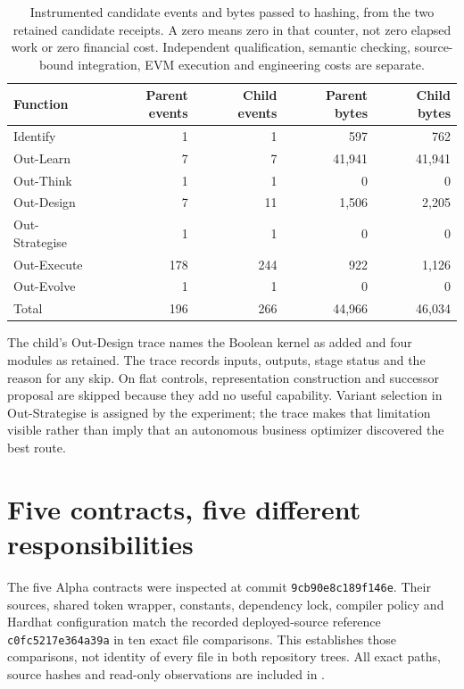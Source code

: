 \documentclass[11pt]{article}
\newcommand{\filename}[1]{\path{#1}}
\begin{document}
\begin{table}[htbp]
\centering
\small
\begin{tabularx}{\linewidth}{Yrrrr}
\toprule
\textbf{Function} & \textbf{Parent events} & \textbf{Child events} & \textbf{Parent bytes} & \textbf{Child bytes}\\
\midrule
Identify & 1 & 1 & 597 & 762\\
Out-Learn & 7 & 7 & 41,941 & 41,941\\
Out-Think & 1 & 1 & 0 & 0\\
Out-Design & 7 & 11 & 1,506 & 2,205\\
Out-Strategise & 1 & 1 & 0 & 0\\
Out-Execute & 178 & 244 & 922 & 1,126\\
Out-Evolve & 1 & 1 & 0 & 0\\
\midrule
Total & 196 & 266 & 44,966 & 46,034\\
\bottomrule
\end{tabularx}
\caption{Instrumented candidate events and bytes passed to hashing, from the two retained candidate receipts. A zero means zero in that counter, not zero elapsed work or zero financial cost. Independent qualification, semantic checking, source-bound integration, EVM execution and engineering costs are separate.}
\label{tab:stagecost}
\end{table}

The child's Out-Design trace names the Boolean kernel as added and four modules as retained. The trace records inputs, outputs, stage status and the reason for any skip. On flat controls, representation construction and successor proposal are skipped because they add no useful capability. Variant selection in Out-Strategise is assigned by the experiment; the trace makes that limitation visible rather than imply that an autonomous business optimizer discovered the best route.



\section{Five contracts, five different responsibilities}

The five Alpha contracts were inspected at commit \texttt{9cb90e8c189f146e}. Their sources, shared token wrapper, constants, dependency lock, compiler policy and Hardhat configuration \cite{alphasource} match the recorded deployed-source reference \texttt{c0fc5217e364a39a} in ten exact file comparisons. This establishes those comparisons, not identity of every file in both repository trees. All exact paths, source hashes and read-only observations are included in \filename{evidence/contracts/}.
\end{document}
